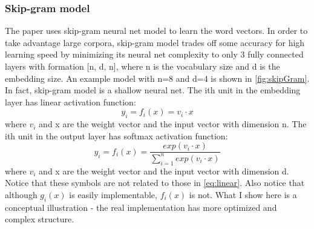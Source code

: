 \documentclass{article}
\begin{document}
\subsubsection{Skip-gram model}
The paper uses skip-gram neural net model to learn the word vectors. In order to take advantage large corpora, skip-gram model trades off some accuracy for high learning speed by minimizing its neural net complexity to only 3 fully connected layers with formation [n, d, n], where n is the vocabulary size and d is the embedding size. An example model with n=8 and d=4 is shown in \autoref{fig:skipGram}. In fact, skip-gram model is a shallow neural net. The ith unit in the embedding layer has linear activation function:
\begin{equation}
	y_i = f_i(x) = v_i \cdot x
	\label{eq:linear}
\end{equation}
where $ v_i $ and x are the weight vector and the input vector with dimension n. The ith unit in the output layer has softmax activation function:
\begin{equation}
	y_i = f_i(x) = \frac{exp(v_i \cdot x)}{\sum_{i = 1}^{n}exp(v_i \cdot x)}
\end{equation}
where $ v_i $ and x are the weight vector and the input vector with dimension d. Notice that these symbols are not related to those in \autoref{eq:linear}. Also notice that although $ g_i(x) $ is easily implementable, $ f_i(x) $ is not. What I show here is a conceptual illustration - the real implementation has more optimized and complex structure.
\end{document}
